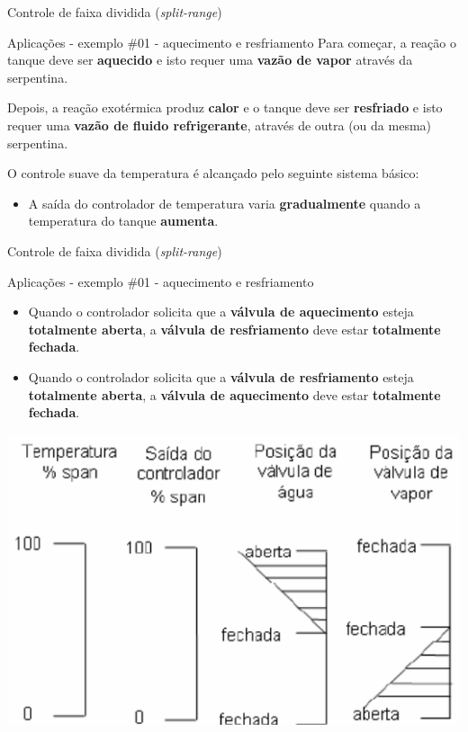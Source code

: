 \begin{frame}{Controle de faixa dividida (\textit{split-range})}
	\begin{block}{Aplicações - exemplo \#01 - aquecimento e resfriamento}
		Para começar, a reação o tanque deve ser \textbf{aquecido} e isto requer uma \textbf{vazão de vapor} através da serpentina.
		
		\medskip
		
		Depois, a reação exotérmica produz \textbf{calor} e o tanque deve ser \textbf{resfriado} e isto requer uma \textbf{vazão de fluido refrigerante}, através de outra (ou da mesma) serpentina.
		
		\medskip
		
		O controle suave da temperatura é alcançado pelo seguinte sistema básico:
		\begin{itemize}
			\item A saída do controlador de temperatura varia \textbf{gradualmente} quando a temperatura do tanque \textbf{aumenta}.
		\end{itemize}
	\end{block}
\end{frame}


\begin{frame}{Controle de faixa dividida (\textit{split-range})}
	\begin{block}{Aplicações - exemplo \#01 - aquecimento e resfriamento}
		\begin{itemize}
			\item Quando o controlador solicita que a \textbf{válvula de aquecimento} esteja \textbf{totalmente aberta}, a \textbf{válvula de resfriamento} deve estar \textbf{totalmente fechada}.
			\item Quando o controlador solicita que a \textbf{válvula de resfriamento} esteja \textbf{totalmente aberta}, a \textbf{válvula de aquecimento} deve estar \textbf{totalmente fechada}.
		\end{itemize}
	\end{block}

	\centering
	\includegraphics[width=0.5\linewidth]{Figuras/Ch15/fig12}
\end{frame}


